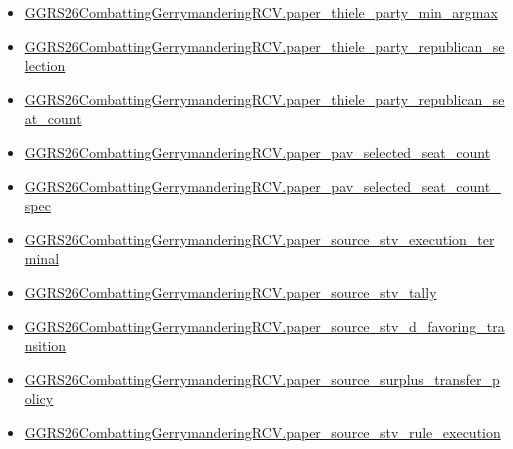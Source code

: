 \documentclass[10pt]{article}
\begin{document}
\begin{itemize}[leftmargin=1.2em]
\begin{itemize}[leftmargin=1.2em]
\item \hyperlink{paper-prerequisite-58801459d14912d4}{GGRS26\allowbreak{}Combatting\allowbreak{}Gerrymandering\allowbreak{}RCV.\allowbreak{}paper\_\allowbreak{}thiele\_\allowbreak{}party\_\allowbreak{}min\_\allowbreak{}argmax}
\item \hyperlink{paper-prerequisite-edccbf02c4bd6a6e}{GGRS26\allowbreak{}Combatting\allowbreak{}Gerrymandering\allowbreak{}RCV.\allowbreak{}paper\_\allowbreak{}thiele\_\allowbreak{}party\_\allowbreak{}republican\_\allowbreak{}selection}
\item \hyperlink{paper-prerequisite-5fa565502cdaaed9}{GGRS26\allowbreak{}Combatting\allowbreak{}Gerrymandering\allowbreak{}RCV.\allowbreak{}paper\_\allowbreak{}thiele\_\allowbreak{}party\_\allowbreak{}republican\_\allowbreak{}seat\_\allowbreak{}count}
\item \hyperlink{paper-prerequisite-c0f468d3ce4de7e0}{GGRS26\allowbreak{}Combatting\allowbreak{}Gerrymandering\allowbreak{}RCV.\allowbreak{}paper\_\allowbreak{}pav\_\allowbreak{}selected\_\allowbreak{}seat\_\allowbreak{}count}
\item \hyperlink{paper-prerequisite-652a33f58da6d128}{GGRS26\allowbreak{}Combatting\allowbreak{}Gerrymandering\allowbreak{}RCV.\allowbreak{}paper\_\allowbreak{}pav\_\allowbreak{}selected\_\allowbreak{}seat\_\allowbreak{}count\_\allowbreak{}spec}
\item \hyperlink{paper-prerequisite-42c2df760fca2c30}{GGRS26\allowbreak{}Combatting\allowbreak{}Gerrymandering\allowbreak{}RCV.\allowbreak{}paper\_\allowbreak{}source\_\allowbreak{}stv\_\allowbreak{}execution\_\allowbreak{}terminal}
\item \hyperlink{paper-prerequisite-587c1da71549064c}{GGRS26\allowbreak{}Combatting\allowbreak{}Gerrymandering\allowbreak{}RCV.\allowbreak{}paper\_\allowbreak{}source\_\allowbreak{}stv\_\allowbreak{}tally}
\item \hyperlink{paper-prerequisite-01a70a9b3aa00da3}{GGRS26\allowbreak{}Combatting\allowbreak{}Gerrymandering\allowbreak{}RCV.\allowbreak{}paper\_\allowbreak{}source\_\allowbreak{}stv\_\allowbreak{}d\_\allowbreak{}favoring\_\allowbreak{}transition}
\item \hyperlink{paper-prerequisite-abed5fd2c2d17fba}{GGRS26\allowbreak{}Combatting\allowbreak{}Gerrymandering\allowbreak{}RCV.\allowbreak{}paper\_\allowbreak{}source\_\allowbreak{}surplus\_\allowbreak{}transfer\_\allowbreak{}policy}
\item \hyperlink{paper-prerequisite-78828233cae137c4}{GGRS26\allowbreak{}Combatting\allowbreak{}Gerrymandering\allowbreak{}RCV.\allowbreak{}paper\_\allowbreak{}source\_\allowbreak{}stv\_\allowbreak{}rule\_\allowbreak{}execution}

\end{itemize}
\end{itemize}
\end{document}
